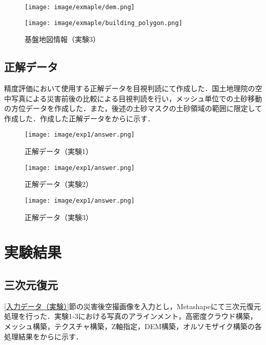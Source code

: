       \begin{figure}[t]
        \begin{minipage}[c]{0.45\hsize}
          \centering
          \texttt{[image: image/exmaple/dem.png]}
        \end{minipage}
        \begin{minipage}[c]{0.45\hsize}
          \centering
          \texttt{[image: image/exmaple/building\_polygon.png]}
        \end{minipage}
        \caption{基盤地図情報（実験3）}
        \label{基盤地図情報（実験3）}
      \end{figure}


    \subsection*{正解データ}
      精度評価において使用する正解データを目視判読にて作成した．国土地理院の空中写真による災害前後の比較\cite{国土地理院空撮画像1, 国土地理院空撮画像2}による目視判読を行い，メッシュ単位での土砂移動の方位データを作成した．また，後述の土砂マスクの土砂領域の範囲に限定して作成した．作成した正解データをからに示す．

      \begin{figure}[t]
        \centering
        \texttt{[image: image/exp1/answer.png]}
        \caption{正解データ（実験1）}
        \label{正解データ（実験1）}
      \end{figure}

      \begin{figure}[t]
        \centering
        \texttt{[image: image/exp1/answer.png]}
        \caption{正解データ（実験2）}
      \end{figure}

      \begin{figure}[t]
        \centering
        \texttt{[image: image/exp1/answer.png]}
        \caption{正解データ（実験3）}
        \label{正解データ（実験3）}
      \end{figure}


  \section{実験結果}
    \label{実験結果}
    \subsection*{三次元復元}
      \ref{入力データ（実験）}節の災害後空撮画像を入力とし，Metashapeにて三次元復元処理を行った．実験1-3における写真のアラインメント，高密度クラウド構築，メッシュ構築，テクスチャ構築，Z軸指定，DEM構築，オルソモザイク構築の各処理結果をからに示す．

